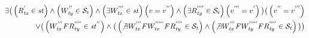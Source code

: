 \documentclass[acmlarge, ,11pt]{acmart}
\begin{document}
  \begin{align}\label{eqn:rw}
\begin{split}
\exists \big( %
\left( {R}^{'}_\mathit{tx} \in \mathit{st} \right)
   \wedge \left( {W}^{''}_\mathit{ty}  \in  \mathcal{S}_t \right) \wedge
   \left( \exists  {W}^{'''}_\mathit{tx} \in \mathit{st}  \right)
   \left( v = {v}^{''} \right)  \wedge
  \left( \exists {R}^{''''}_\mathit{ty} \in \mathcal{S}_t  \right) \left( {v}^{'''} = {v}^{'} \right)  \big)
  \big( \left( {v}^{''} = {v}^{'''} \right)  \\
   \vee  \big(  \left( {W}^{'''}_\mathit{tx} F { R}^{''''}_\mathit{ty} \in \mathit{st}^{''} \right)  \wedge
    \big( \left(  \not\exists {W}^{'''}_\mathit{tx} F {W}^{'''''}_\mathit{tx} F { R}^{''''}_\mathit{ty} \in \mathcal{S}_t \right)  \wedge
   \left(  \not\exists {W}^{'''}_\mathit{tx} F {W}^{'''''}_\mathit{ty} F { R}^{''''}_\mathit{ty} \in \mathcal{S}_t \right) \big) \big)
  \end{split}
  \end{align}
%
\end{document}
